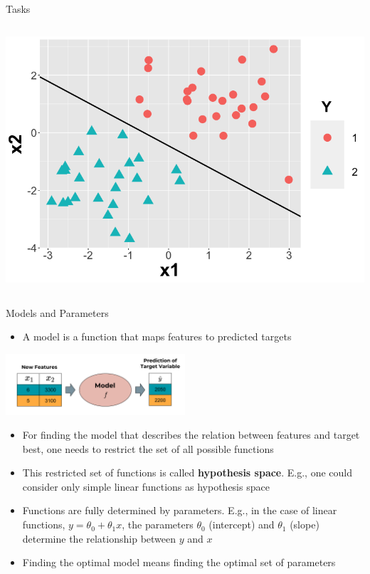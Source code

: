 \documentclass[11pt,compress,t,notes=noshow, xcolor=table]{beamer}
\begin{document}
\begin{vbframe}{Tasks}
\begin{columns}
\begin{column}{0.4\textwidth}
  \begin{center}
    \includegraphics[width=\textwidth]{figure/nutshell-ml-basics-supervised-classification-task.png}
  \end{center}
\end{column}
\end{columns}

\end{vbframe}


\begin{vbframe}{Models and Parameters}
\small
\begin{itemize}
    \item A model is a function that maps features to predicted targets
\end{itemize}

\begin{center}
  \includegraphics[width = 0.5\textwidth]{figure_man/the_model_web.png}
\end{center}

\small
\begin{itemize}
\item  For finding the model that describes the relation between features and target best, one needs to restrict the set of all possible functions
\item This restricted set of functions is called \textbf{hypothesis space}. E.g., one could consider only simple linear functions as hypothesis space
\item Functions are fully determined by parameters. E.g., in the case of linear functions, $y = \theta_0 + \theta_1 x $, the parameters $\theta_0$ (intercept) and $\theta_1$ (slope) determine the relationship between $y$ and $x$
\item Finding the optimal model means finding the optimal set of parameters
\end{itemize}

\end{vbframe}
\end{document}
